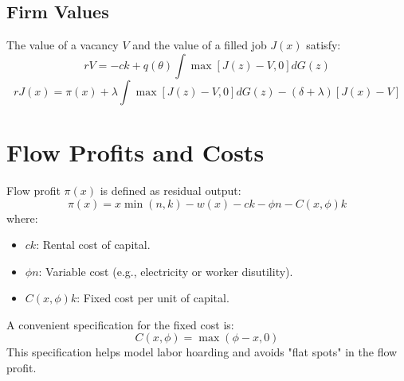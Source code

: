 \documentclass[11pt]{article}
\begin{document}
\subsection{Firm Values}
The value of a vacancy $V$ and the value of a filled job $J(x)$ satisfy:
\begin{equation}
rV = -ck + q(\theta) \int \max[J(z) - V, 0] dG(z)
\end{equation}
\begin{equation}
rJ(x) = \pi(x) + \lambda \int \max[J(z) - V, 0] dG(z) - (\delta + \lambda)[J(x) - V]
\end{equation}

\section{Flow Profits and Costs}
Flow profit $\pi(x)$ is defined as residual output:
\begin{equation}
\pi(x) = x \min(n, k) - w(x) - ck - \phi n - C(x, \phi)k
\end{equation}
where:
\begin{itemize}
    \item $ck$: Rental cost of capital.
    \item $\phi n$: Variable cost (e.g., electricity or worker disutility).
    \item $C(x, \phi)k$: Fixed cost per unit of capital.
\end{itemize}
A convenient specification for the fixed cost is:
\begin{equation}
C(x, \phi) = \max(\phi - x, 0)
\end{equation}
This specification helps model labor hoarding and avoids "flat spots" in the flow profit.
\end{document}
